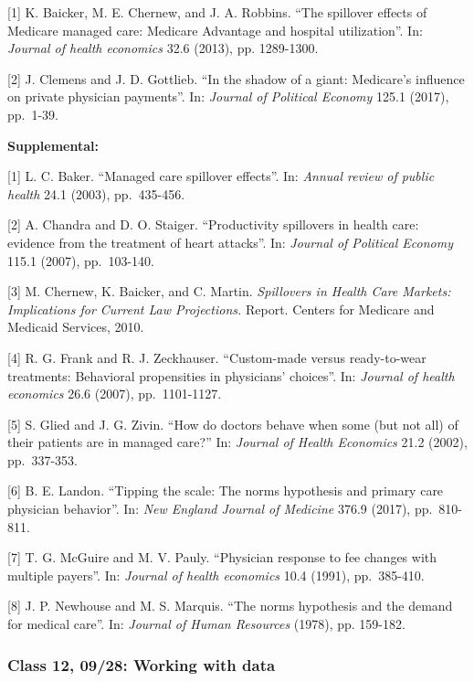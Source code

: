 \documentclass[11pt,]{article}
\begin{document}
{[}1{]} K. Baicker, M. E. Chernew, and J. A. Robbins. ``The spillover
effects of Medicare managed care: Medicare Advantage and hospital
utilization''. In: \emph{Journal of health economics} 32.6 (2013), pp.
1289-1300.

{[}2{]} J. Clemens and J. D. Gottlieb. ``In the shadow of a giant:
Medicare's influence on private physician payments''. In: \emph{Journal
of Political Economy} 125.1 (2017), pp.~1-39.

\textbf{Supplemental:}

{[}1{]} L. C. Baker. ``Managed care spillover effects''. In:
\emph{Annual review of public health} 24.1 (2003), pp.~435-456.

{[}2{]} A. Chandra and D. O. Staiger. ``Productivity spillovers in
health care: evidence from the treatment of heart attacks''. In:
\emph{Journal of Political Economy} 115.1 (2007), pp.~103-140.

{[}3{]} M. Chernew, K. Baicker, and C. Martin. \emph{Spillovers in
Health Care Markets: Implications for Current Law Projections.} Report.
Centers for Medicare and Medicaid Services, 2010.

{[}4{]} R. G. Frank and R. J. Zeckhauser. ``Custom-made versus
ready-to-wear treatments: Behavioral propensities in physicians'
choices''. In: \emph{Journal of health economics} 26.6 (2007),
pp.~1101-1127.

{[}5{]} S. Glied and J. G. Zivin. ``How do doctors behave when some (but
not all) of their patients are in managed care?'' In: \emph{Journal of
Health Economics} 21.2 (2002), pp.~337-353.

{[}6{]} B. E. Landon. ``Tipping the scale: The norms hypothesis and
primary care physician behavior''. In: \emph{New England Journal of
Medicine} 376.9 (2017), pp.~810-811.

{[}7{]} T. G. McGuire and M. V. Pauly. ``Physician response to fee
changes with multiple payers''. In: \emph{Journal of health economics}
10.4 (1991), pp.~385-410.

{[}8{]} J. P. Newhouse and M. S. Marquis. ``The norms hypothesis and the
demand for medical care''. In: \emph{Journal of Human Resources} (1978),
pp. 159-182.

\hypertarget{class-12-0928-working-with-data}{%
\subsubsection{Class 12, 09/28: Working with
data}\label{class-12-0928-working-with-data}}
\end{document}
